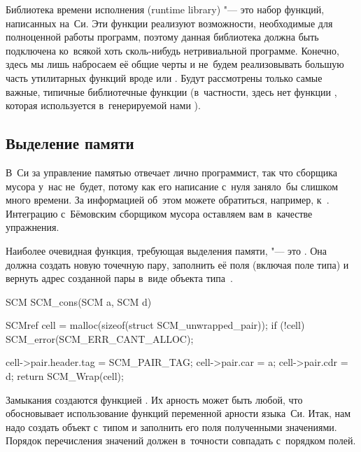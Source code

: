 Библиотека времени исполнения (runtime library) "--- это набор функций,
написанных на~Си. Эти функции реализуют возможности, необходимые для полноценной
работы программ, поэтому данная библиотека должна быть подключена ко~всякой хоть
сколь-нибудь нетривиальной программе. Конечно, здесь мы лишь набросаем её общие
черты и не~будем реализовывать большую часть утилитарных функций вроде
 или . Будут рассмотрены только самые
важные, типичные библиотечные функции (в~частности, здесь нет функции
, которая используется в~генерируемой нами ).


\subsection{Выделение памяти}\label{cc/runtime/ssect:alloc}

В~Си за управление памятью отвечает лично программист, так что сборщика мусора
у~нас не~будет, потому как его написание с~нуля заняло~бы слишком много времени.
За информацией об~этом можете обратиться, например, к~\cite{spi90,wil92}.%
{\fnstyle{\RaggedRight}} Интеграцию с~Бёмовским сборщиком мусора \cite{bw88} оставляем
вам в~качестве упражнения.

Наиболее очевидная функция, требующая выделения памяти, "--- это . Она
должна создать новую точечную пару, заполнить её поля (включая поле типа) и
вернуть адрес созданной пары в~виде объекта типа~.

\begin{code:c}
SCM SCM_cons(SCM a, SCM d)
{
    SCMref cell = malloc(sizeof(struct SCM_unwrapped_pair));
    if (!cell)
    {
        SCM_error(SCM_ERR_CANT_ALLOC);
    }
    
    cell->pair.header.tag = SCM_PAIR_TAG;
    cell->pair.car = a;
    cell->pair.cdr = d;
    return SCM_Wrap(cell);
}
\end{code:c}

Замыкания создаются функцией . Их арность может быть любой, что
обосновывает использование функций переменной арности языка~Си. Итак, нам надо
создать объект с~типом  и заполнить его поля полученными
значениями. Порядок перечисления значений должен в~точности совпадать
с~порядком полей.

